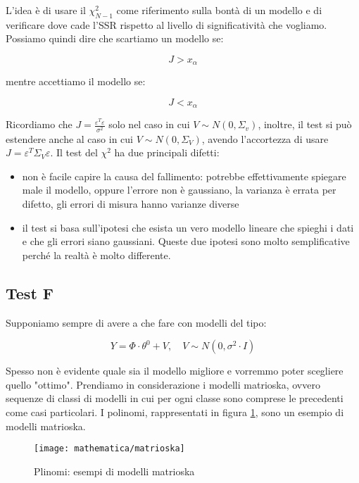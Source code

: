 L'idea è di usare il $\chi_{N-1}^2$ come riferimento sulla bontà di un modello e di verificare dove cade l'SSR rispetto al livello di significatività che vogliamo. Possiamo quindi dire che scartiamo un modello se:

    \[ J>x_\alpha \]

mentre accettiamo il modello se:

    \[ J<x_\alpha \]

Ricordiamo che $J=\frac{\varepsilon^T\varepsilon}{\sigma^2}$ solo nel caso in cui $V\sim N(0,\Sigma_v)$, inoltre, il test si può estendere anche al caso in cui $V\sim N(0,\Sigma_V)$, avendo l'accortezza di usare $J=\varepsilon^T\Sigma_V\varepsilon$. \newline
Il test del $\chi^2$ ha due principali difetti:
\begin{itemize}
  \item non è facile capire la causa del fallimento: potrebbe effettivamente spiegare male il modello, oppure l'errore non è gaussiano, la varianza è errata per difetto, gli errori di misura hanno varianze diverse
  \item il test si basa sull'ipotesi che esista un vero modello lineare che spieghi i dati e che gli errori siano gaussiani. Queste due ipotesi sono molto semplificative perché la realtà è molto differente.
\end{itemize}
\subsection{Test F}
Supponiamo sempre di avere a che fare con modelli del tipo:

    \[ Y=\Phi\cdot\theta^0+V,  \quad  V\sim N(0,\sigma^2\cdot I) \]

Spesso non è evidente quale sia il modello migliore e vorremmo poter scegliere quello "ottimo". Prendiamo in considerazione i modelli matrioska, ovvero sequenze di classi di modelli in cui per ogni classe sono comprese le precedenti come casi particolari. I polinomi, rappresentati in figura \ref{fig:matrioska}, sono un esempio di modelli matrioska.

\begin{figure}[htbp]
  \centering
  \texttt{[image: mathematica/matrioska]}
  \caption{Plinomi: esempi di modelli matrioska\label{fig:matrioska}}
\end{figure}

